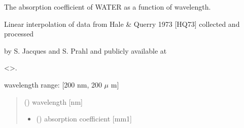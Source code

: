 \documentclass[letterpaper,10pt,english]{sphinxmanual}
\begin{document}
\begin{fulllineitems}
\label{\detokenize{03_absorption_coefficient:skinoptics.absorption_coefficient.mua_wat_Hale}}
\pysigstartsignatures
{}
\pysigstopsignatures
\begin{DUlineblock}{0em}
\item[] The absorption coefficient of WATER as a function of wavelength.
\item[] Linear interpolation of data from Hale \& Querry 1973 {[}HQ73{]} collected and processed 
\item[] by S. Jacques and S. Prahl and publicly available at
\item[] \textless{}\textgreater{}.
\end{DUlineblock}

\sphinxAtStartPar
wavelength range: {[}200 nm, 200 \(\mu\) m{]}
\begin{quote}\begin{description}
\sphinxAtStartPar
{} () \textendash{} wavelength {[}nm{]}

\sphinxAtStartPar
\begin{itemize}
\item {} 
\sphinxAtStartPar
{} () \textendash{} absorption coefficient {[}mm\sphinxhyphen{}1{]}

\end{itemize}


\end{description}\end{quote}

\end{fulllineitems}

\end{document}

